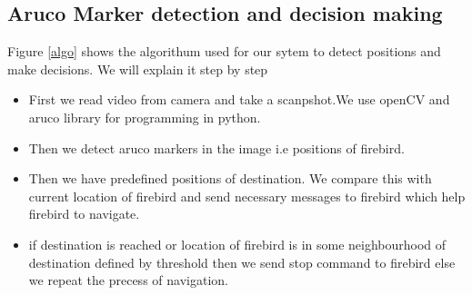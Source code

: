 \documentclass[]{exam}
\begin{document}
  


\subsection{\color{red} Aruco Marker detection and decision making}
Figure \ref{algo} shows the algorithum used for our sytem to detect positions and make decisions. We will explain it step by step 
\begin{itemize}
\item First we read video from camera and take a scanpshot.We use openCV and aruco library for programming in python. 
\item Then we detect aruco markers in the image i.e positions of firebird.
\item Then we have predefined positions of destination. We compare this with current location of firebird and send necessary messages to firebird which help firebird to navigate. 
\item if destination is reached or location of firebird is in some neighbourhood of destination defined by threshold then we send stop command to firebird else we repeat the precess of navigation. 
\end{itemize}
\end{document}
